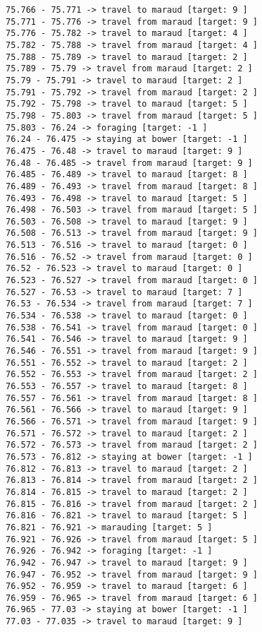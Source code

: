\documentclass[11pt]{article}
\begin{document}
\begin{Verbatim}[commandchars=\\\{\}]
75.766 - 75.771 -> travel to maraud [target: 9 ]
75.771 - 75.776 -> travel from maraud [target: 9 ]
75.776 - 75.782 -> travel to maraud [target: 4 ]
75.782 - 75.788 -> travel from maraud [target: 4 ]
75.788 - 75.789 -> travel to maraud [target: 2 ]
75.789 - 75.79 -> travel from maraud [target: 2 ]
75.79 - 75.791 -> travel to maraud [target: 2 ]
75.791 - 75.792 -> travel from maraud [target: 2 ]
75.792 - 75.798 -> travel to maraud [target: 5 ]
75.798 - 75.803 -> travel from maraud [target: 5 ]
75.803 - 76.24 -> foraging [target: -1 ]
76.24 - 76.475 -> staying at bower [target: -1 ]
76.475 - 76.48 -> travel to maraud [target: 9 ]
76.48 - 76.485 -> travel from maraud [target: 9 ]
76.485 - 76.489 -> travel to maraud [target: 8 ]
76.489 - 76.493 -> travel from maraud [target: 8 ]
76.493 - 76.498 -> travel to maraud [target: 5 ]
76.498 - 76.503 -> travel from maraud [target: 5 ]
76.503 - 76.508 -> travel to maraud [target: 9 ]
76.508 - 76.513 -> travel from maraud [target: 9 ]
76.513 - 76.516 -> travel to maraud [target: 0 ]
76.516 - 76.52 -> travel from maraud [target: 0 ]
76.52 - 76.523 -> travel to maraud [target: 0 ]
76.523 - 76.527 -> travel from maraud [target: 0 ]
76.527 - 76.53 -> travel to maraud [target: 7 ]
76.53 - 76.534 -> travel from maraud [target: 7 ]
76.534 - 76.538 -> travel to maraud [target: 0 ]
76.538 - 76.541 -> travel from maraud [target: 0 ]
76.541 - 76.546 -> travel to maraud [target: 9 ]
76.546 - 76.551 -> travel from maraud [target: 9 ]
76.551 - 76.552 -> travel to maraud [target: 2 ]
76.552 - 76.553 -> travel from maraud [target: 2 ]
76.553 - 76.557 -> travel to maraud [target: 8 ]
76.557 - 76.561 -> travel from maraud [target: 8 ]
76.561 - 76.566 -> travel to maraud [target: 9 ]
76.566 - 76.571 -> travel from maraud [target: 9 ]
76.571 - 76.572 -> travel to maraud [target: 2 ]
76.572 - 76.573 -> travel from maraud [target: 2 ]
76.573 - 76.812 -> staying at bower [target: -1 ]
76.812 - 76.813 -> travel to maraud [target: 2 ]
76.813 - 76.814 -> travel from maraud [target: 2 ]
76.814 - 76.815 -> travel to maraud [target: 2 ]
76.815 - 76.816 -> travel from maraud [target: 2 ]
76.816 - 76.821 -> travel to maraud [target: 5 ]
76.821 - 76.921 -> marauding [target: 5 ]
76.921 - 76.926 -> travel from maraud [target: 5 ]
76.926 - 76.942 -> foraging [target: -1 ]
76.942 - 76.947 -> travel to maraud [target: 9 ]
76.947 - 76.952 -> travel from maraud [target: 9 ]
76.952 - 76.959 -> travel to maraud [target: 6 ]
76.959 - 76.965 -> travel from maraud [target: 6 ]
76.965 - 77.03 -> staying at bower [target: -1 ]
77.03 - 77.035 -> travel to maraud [target: 9 ]

\end{Verbatim}
\end{document}
